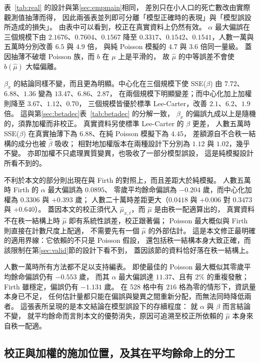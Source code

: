 \documentclass[UTF8, fontset=macnew, a4paper, 12pt]{ctexart}
\begin{document}
表~\ref{tab:real} 的設計與第\ref{sec:empmain}相同，
差別只在小人口的死亡數改由實際觀測值抽薄而得，
因此兩張表並列即可分離「模型正確時的表現」與「模型誤設所造成的損失」。
由表中可以看到，校正在真實資料上仍然有效。
$\alpha$ 最大偏誤在三個規模下由 $2.1676$、$0.7604$、$0.1567$
降至 $0.3317$、$0.1542$、$0.1541$，人數一萬與五萬時分別改善 $6.5$ 與 $4.9$ 倍，
與純 Poisson 模擬的 $4.7$ 與 $3.6$ 倍同一量級。
蓋因抽薄不破壞 Poisson 族，而 $b$ 在 $\mu$ 上是平滑的，
故 $\hat\mu$ 的中等誤差不會使 $b(\hat\mu)$ 大幅偏離。

$\beta_x$ 的結論同樣不變，而且更為明顯。中心化在三個規模下使
SSE($\beta$) 由 $7.72$、$6.88$、$1.36$ 變為 $13.47$、$6.86$、$2.87$，
在兩個規模下明顯變差；而中心化加上加權則降至 $3.67$、$1.12$、$0.70$，
三個規模皆優於標準 Lee-Carter，改善 $2.1$、$6.2$、$1.9$ 倍。
這與第\ref{sec:betadec}表~\ref{tab:betadec} 的分解一致，
$\beta_x$ 的偏誤九成以上是隨機的，須靠加權而非校正。
真實資料另使標準 Lee-Carter 的 $\beta$ 更差，
人數五萬時 SSE($\beta$) 在真實抽薄下為 $6.88$、在純 Poisson 模擬下為 $4.45$，
差額源自不合秩一結構的成分也被 $\hat\beta$ 吸收；
相對地加權版本在兩種設計下分別為 $1.12$ 與 $1.02$，幾乎不變。
亦即加權不只處理異質變異，也吸收了一部分模型誤設，
這是純模擬設計所看不到的。

不利於本文的部分則出現在與 Firth 的對照上，而且差距大於純模擬。
人數五萬時 Firth 的 $\alpha$ 最大偏誤為 $0.0895$、
零歲平均餘命偏誤為 $-0.204$ 歲，而中心化加權為 $0.3306$ 與 $+0.393$ 歲；
人數二十萬時差距更大（$0.0418$ 與 $+0.006$ 對 $0.3473$ 與 $+0.640$）。
蓋因本文的校正須代入 $\hat\mu_{x,t}$，而 $\hat\mu$ 是由秩一配適算出的，
真實資料不在秩一結構上時 $\hat\mu$ 即有系統性誤差，校正跟著偏；
Poisson 最大概似與 Firth 則直接在計數尺度上配適，
不需要先有一個 $\hat\mu$ 的外部估計。
這是本文修正最明確的適用界線：它依賴的不只是 Poisson 假設，
還包括秩一結構本身大致正確，而該限制在第\ref{sec:valid}節的設計下看不到，
蓋因該節的資料恰好落在秩一結構上。

人數一萬時所有方法都不足以支持編表。
即使最佳的 Poisson 最大概似其零歲平均餘命偏誤仍有 $-0.553$ 歲，
而其 $\alpha$ 最大偏誤達 $11.37$、且有 $2\%$ 的重複發散；
Firth 雖穩定，偏誤仍有 $-1.131$ 歲。
在 528 格中有 $216$ 格為零的情形下，資訊量本身已不足，
任何估計量都只能在偏誤與變異之間重新分配，而無法同時降低兩者。
這張表所呈現的是本文結論在模型誤設下的存續程度：
就 $\alpha$ 與 $\beta$ 而言結論不變，
就平均餘命而言則本文的優勢消失，原因可追溯至校正所依賴的 $\hat\mu$
本身來自秩一配適。

\subsection{校正與加權的施加位置，及其在平均餘命上的分工}\label{sec:joint}\label{sec:split}
\end{document}
